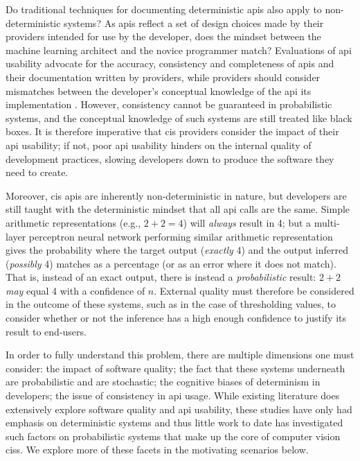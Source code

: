 Do traditional techniques for documenting deterministic \glspl{api} also apply to non-deterministic systems? As \glspl{api} reflect a set of design choices made by their providers intended for use by the developer, does the mindset between the machine learning architect and the novice programmer match? Evaluations of \gls{api} usability advocate for the accuracy, consistency and completeness of \glspl{api} and their documentation \citep{Piccioni:2013em,Robillard:2009uk} written by providers, while providers should consider mismatches between the developer's conceptual knowledge of the \gls{api} its implementation \citep{Ko:2011fb}. However, consistency cannot be guaranteed in probabilistic systems, and the conceptual knowledge of such systems are still treated like black boxes. It is therefore imperative that \gls{cis} providers consider the impact of their \gls{api} usability; if not, poor \gls{api} usability hinders on the internal quality of development practices, slowing developers down to produce the software they need to create.

Moreover, \gls{cis} \glspl{api} are inherently non-deterministic in nature, but developers are still taught with the deterministic mindset that all \gls{api} calls are the same. Simple arithmetic representations (e.g., $2+2=4$) will \textit{always} result in 4; but a multi-layer perceptron neural network performing similar arithmetic representation \citep{Blake:1998vd} gives the probability where the target output (\textit{exactly} 4) and the output inferred (\textit{possibly} 4) matches as a percentage (or as an error where it does not match). That is, instead of an exact output, there is instead a \textit{probabilistic} result: $2+2$ \textit{may} equal 4 with a confidence of $n$. External quality must therefore be considered in the outcome of these systems, such as in the case of thresholding values, to consider whether or not the inference has a high enough confidence to justify its result to end-users.

In order to fully understand this problem, there are multiple dimensions one must consider: the impact of software quality; the fact that these systems underneath are probabilistic and are stochastic; the cognitive biases of determinism in developers; the issue of consistency in \gls{api} usage. While existing literature does extensively explore software quality and \gls{api} usability, these studies have only had emphasis on deterministic systems and thus little work to date has investigated such factors on probabilistic systems that make up the core of computer vision \glspl{cis}. We explore more of these facets in the motivating scenarios below.

